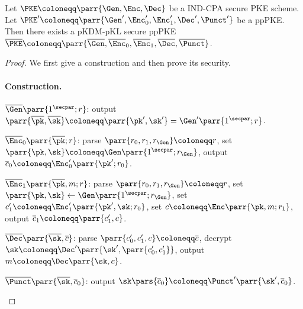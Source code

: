 \begin{lemma}
    Let \(\PKE \coloneqq \parr{\Gen, \Enc, \Dec}\) be a IND-CPA secure PKE scheme.
    Let \(\PKE' \coloneqq \parr{\Gen', \Enc'_0, \Enc'_1, \Dec', \Punct'}\) be a ppPKE.
    Then there exists a pKDM-pKL secure ppPKE \(\overline{\PKE} \coloneqq \parr{\overline{\Gen}, \overline{\Enc}_0, \overline{\Enc}_1, \overline{\Dec}, \overline{\Punct}}\).
\end{lemma}

\begin{proof}
    We first give a construction and then prove its security.
    \paragraph{Construction.}
    \begin{sitemize}
        \item \(\overline{\Gen}\parr{1^\secpar;r}\):
        output \(\parr{\overline{\pk},\overline{\sk}} \coloneqq \parr{\pk',\sk'} = \Gen'\parr{1^\secpar;r}\).

        \item \(\overline{\Enc}_0\parr{\overline{\pk};r}\):
        parse \(\parr{r_0,r_1,r_{\Gen}} \coloneqq r\),
        set \(\parr{\pk,\sk} \coloneqq \Gen\parr{1^\secpar;r_{\Gen}}\),
        output \(\overline{c}_0 \coloneqq \Enc'_0\parr{\pk';r_0}\).

        \item \(\overline{\Enc}_1\parr{\overline{\pk},m;r}\):
        parse \(\parr{r_0,r_1,r_{\Gen}} \coloneqq r\),
        set \(\parr{\pk,\sk} \gets \Gen\parr{1^\secpar;r_{\Gen}}\),
        set \(c'_1 \coloneqq \Enc'_1\parr{\pk',\sk;r_0}\),
        set \(c \coloneqq \Enc\parr{\pk,m;r_1}\),
        output \(\overline{c}_1 \coloneqq \parr{c'_1,c}\).

        \item \(\overline{\Dec}\parr{\overline{\sk},\overline{c}}\):
        parse \(\parr{c'_0,c'_1,c} \coloneqq \overline{c}\),
        decrypt \(\sk \coloneqq \Dec'\parr{\sk',\parr{c'_0,c'_1}}\),
        output \(m \coloneqq \Dec\parr{\sk,c}\).

        \item \(\overline{\Punct}\parr{\overline{\sk},\overline{c}_0}\):
        output \(\sk\pars{\overline{c}_0} \coloneqq \Punct'\parr{\sk',\overline{c}_0}\).
    \end{sitemize}


\end{proof}
